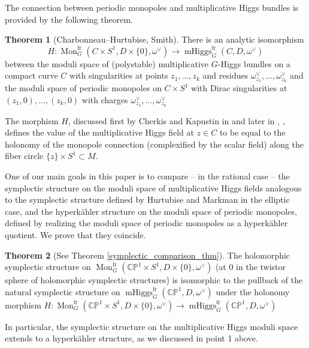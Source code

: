 \documentclass[11pt, oneside, reqno]{amsart}
\theoremstyle{definition} \newtheorem{definition}{Definition}[section]
\newtheorem{theorem}[definition]{Theorem}
\theoremstyle{definition} \newtheorem{remark}[definition]{Remark}
\theoremstyle{definition} \newtheorem{remarks}[definition]{Remarks}
\theoremstyle{definition} \newtheorem{question}[definition]{Question}
\theoremstyle{definition} \newtheorem*{note}{Note}
\theoremstyle{definition} \newtheorem{example}[definition]{Example}
\theoremstyle{definition} \newtheorem{examples}[definition]{Examples}
\newcommand{\bb}[1]{\mathbb{#1}}
\DeclareMathOperator{\mhiggs}{mHiggs}
\DeclareMathOperator{\mon}{Mon}
\newcommand{\fr}{\mathrm{fr}}
\begin{document}
The connection between periodic monopoles and multiplicative Higgs bundles is provided by the following theorem.
\begin{theorem}[Charbonneau--Hurtubise, Smith]
  There is an analytic isomorphism 
  \begin{equation*}
    H: \mon_G^\fr(C \times S^1,D \times\{0\},\omega^\vee) \to \mhiggs_G^{\text{fr}}(C,D,\omega^\vee)
  \end{equation*}
between the moduli space of (polystable) multiplicative $G$-Higgs bundles on a compact curve $C$ with singularities at points $z_1, \ldots, z_k$ and residues $\omega^\vee_{z_1}, \ldots, \omega^\vee_{z_k}$ and the moduli space of periodic monopoles on $C \times S^1$ with Dirac singularities at $(z_1,0), \ldots, (z_k,0)$ with charges $\omega^\vee_{z_1}, \ldots, \omega^\vee_{z_k}$
\end{theorem}

The morphism $H$,  discussed first by Cherkis and Kapustin in \cite{CherkisKapustin2} and later in
\cite{CharbonneauHurtubise}, \cite{Smith}, \cite{NekrasovPestun}
defines the value of the multiplicative Higgs field at $z \in C$ to be equal to
the holonomy of the monopole connection (complexified by the scalar field) along the fiber circle $\{z\} \times S^{1} \subset M$.






One of our main goals in this paper is to compare -- in the rational case -- the symplectic structure on the moduli space of multiplicative Higgs fields analogous to the symplectic structure defined by Hurtubise and Markman in the elliptic case, and the hyperk\"ahler structure on the moduli space of periodic monopoles, defined by realizing the moduli space of periodic monopoles as a hyperk\"ahler quotient.  We prove that they coincide.

\begin{theorem}[See Theorem \ref{symplectic_comparison_thm}]
  The holomorphic symplectic structure on
  $\mon_G^\fr(\bb{CP}^1 \times S^1,D \times\{0\},\omega^\vee)$ (at 0
  in the twistor sphere of holomorphic symplectic structures) 
  is isomorphic to the pullback of the natural symplectic structure on
  $\mhiggs_G^{\text{fr}}(\bb{CP}^1,D,\omega^\vee)$ under the
  holonomy morphism $H: \mon_G^\fr(\bb{CP}^1 \times S^1,D \times\{0\},\omega^\vee) \to \mhiggs_G^{\text{fr}}(\bb{CP}^1,D,\omega^\vee)$  
\end{theorem}

In particular, the symplectic structure on the multiplicative Higgs moduli space extends to a hyperk\"ahler structure, as we discussed in point 1 above.
\end{document}
